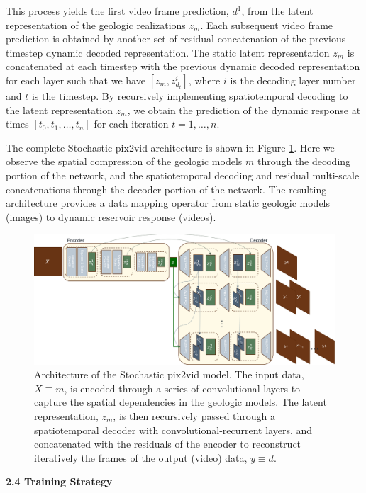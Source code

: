 \documentclass[10pt, twoside]{article}
\begin{document}
This process yields the first video frame prediction, $d^1$, from the latent representation of the geologic realizations $z_m$. Each subsequent video frame prediction is obtained by another set of residual concatenation of the previous timestep dynamic decoded representation. The static latent representation $z_m$ is concatenated at each timestep with the previous dynamic decoded representation for each layer such that we have $[z_m,z_{d_t}^i]$, where $i$ is the decoding layer number and $t$ is the timestep. By recursively implementing spatiotemporal decoding to the latent representation $z_m$, we obtain the prediction of the dynamic response at times $[t_0,t_1,\ldots,t_n]$ for each iteration $t=1,\ldots,n$.

The complete Stochastic pix2vid architecture is shown in Figure \ref{cnnrnn_architecture}. Here we observe the spatial compression of the geologic models $m$ through the decoding portion of the network, and the spatiotemporal decoding and residual multi-scale concatenations through the decoder portion of the network. The resulting architecture provides a data mapping operator from static geologic models (images) to dynamic reservoir response (videos).

\begin{figure}[t]
    \centering
    \includegraphics[width=16cm]{figures/architecture.png}
    \caption{Architecture of the Stochastic pix2vid model. The input data, $X\equiv m$, is encoded through a series of convolutional layers to capture the spatial dependencies in the geologic models. The latent representation, $z_m$, is then recursively passed through a spatiotemporal decoder with convolutional-recurrent layers, and concatenated with the residuals of the encoder to reconstruct iteratively the frames of the output (video) data, $y\equiv d$.}
    \label{cnnrnn_architecture}
\end{figure}


\textbf{2.4 Training Strategy} 
\end{document}
